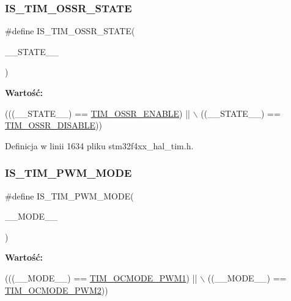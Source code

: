 \subsubsection{\texorpdfstring{I\+S\+\_\+\+T\+I\+M\+\_\+\+O\+S\+S\+R\+\_\+\+S\+T\+A\+TE}{IS\_TIM\_OSSR\_STATE}}
{\footnotesize\ttfamily \#define I\+S\+\_\+\+T\+I\+M\+\_\+\+O\+S\+S\+R\+\_\+\+S\+T\+A\+TE(\begin{DoxyParamCaption}\item[{}]{\+\_\+\+\_\+\+S\+T\+A\+T\+E\+\_\+\+\_\+ }\end{DoxyParamCaption})}

{\bfseries Wartość\+:}
\begin{DoxyCode}
(((\_\_STATE\_\_) == \hyperlink{group___t_i_m___o_s_s_r___off___state___selection__for___run__mode__state_ga5d21918f173eca946748a1fbc177daa5}{TIM\_OSSR\_ENABLE}) || \(\backslash\)
                                            ((\_\_STATE\_\_) == \hyperlink{group___t_i_m___o_s_s_r___off___state___selection__for___run__mode__state_gae11820b467ef6d74c90190c8cfce5e73}{TIM\_OSSR\_DISABLE}))
\end{DoxyCode}


Definicja w linii 1634 pliku stm32f4xx\+\_\+hal\+\_\+tim.\+h.

\mbox{\label{group___t_i_m___private___macros_ga7274d2a669edfcb25bcf610ec85a528b}} 
\subsubsection{\texorpdfstring{I\+S\+\_\+\+T\+I\+M\+\_\+\+P\+W\+M\+\_\+\+M\+O\+DE}{IS\_TIM\_PWM\_MODE}}
{\footnotesize\ttfamily \#define I\+S\+\_\+\+T\+I\+M\+\_\+\+P\+W\+M\+\_\+\+M\+O\+DE(\begin{DoxyParamCaption}\item[{}]{\+\_\+\+\_\+\+M\+O\+D\+E\+\_\+\+\_\+ }\end{DoxyParamCaption})}

{\bfseries Wartość\+:}
\begin{DoxyCode}
(((\_\_MODE\_\_) == \hyperlink{group___t_i_m___output___compare__and___p_w_m__modes_ga766271da571888dfecd9130c3887e9c6}{TIM\_OCMODE\_PWM1})               || \(\backslash\)
                                   ((\_\_MODE\_\_) == \hyperlink{group___t_i_m___output___compare__and___p_w_m__modes_ga88ce4251743c2c07e19fdd5a0a310580}{TIM\_OCMODE\_PWM2}))
\end{DoxyCode}


